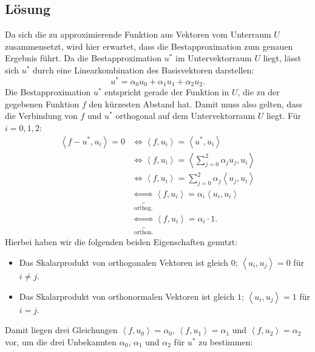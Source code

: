 \documentclass[german,12pt]{homework}
\newcommand{\dotproduct}[2]{\left\langle{#1, #2}\right\rangle}
\begin{document}
    \subsection*{Lösung} Da sich die zu approximierende Funktion aus Vektoren
    vom Unterraum \(U\) zusammensetzt, wird hier erwartet, dass die
    Bestapproximation zum genauen Ergebnis führt. Da die Bestapproximation
    \(u^*\) im Untervektorraum \(U\) liegt, lässt sich \(u^*\) durch eine
    Linearkombination des Basisvektoren darstellen:
    \[u^* = \alpha_0u_0 + \alpha_1u_1 + \alpha_2u_2.\]
    Die Bestapproximation \(u^*\) entspricht gerade der Funktion in \(U\), die
    zu der gegebenen Funktion \(f\) den kürzesten Abstand hat. Damit muss also
    gelten, dass die Verbindung von \(f\) und \(u^*\) orthogonal auf dem
    Untervektorraum \(U\) liegt. Für \(i = 0, 1, 2\):
    \begin{align*}
        \dotproduct{f - u^*}{u_i} = 0 &\iff \dotproduct{f}{u_i} =
        \dotproduct{u^*}{u_i}\\
        &\iff \dotproduct{f}{u_i} = \dotproduct{\sum_{j = 0}^2\alpha_ju_j}
        {u_i}\\
        &\iff \dotproduct{f}{u_i} = \sum_{j = 0}^2\alpha_j\dotproduct{u_j}
        {u_i}\\
        &\underbrace{\iff}_\text{orthog.} \dotproduct{f}{u_i} =
        \alpha_i\dotproduct{u_i}{u_i}\\
        &\underbrace{\iff}_\text{orthon.} \dotproduct{f}{u_i} = \alpha_i \cdot
        1.
    \end{align*}
    Hierbei haben wir die folgenden beiden Eigenschaften genutzt:
    \begin{itemize}
        \item Das Skalarprodukt von orthogonalen Vektoren ist gleich \(0\); \(\dotproduct{u_i}{u_j} = 0\) für \(i \ne j\).
        \item Das Skalarprodukt von orthonormalen Vektoren ist gleich \(1\);
        \(\dotproduct{u_i}{u_j} = 1\) für \(i = j\).
    \end{itemize}
    Damit liegen drei Gleichungen \(\dotproduct{f}{u_0} = \alpha_0\),
    \(\dotproduct{f}{u_1} = \alpha_1\) und \(\dotproduct{f}{u_2} = \alpha_2\)
    vor, um die drei Unbekannten \(\alpha_0\), \(\alpha_1\) und \(\alpha_2\) für
    \(u^*\) zu bestimmen:
\end{document}
